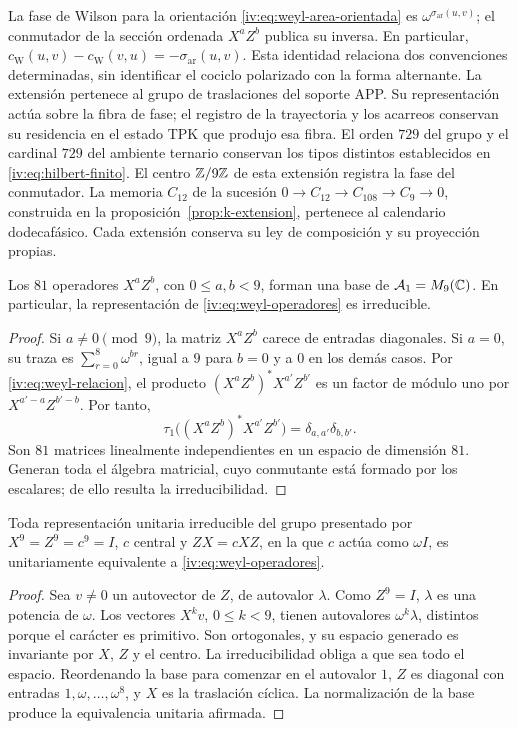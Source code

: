 La fase de Wilson para la orientación
\eqref{iv:eq:weyl-area-orientada} es
\(\omega^{\sigma_{\mathrm{ar}}(u,v)}\); el conmutador de la
sección ordenada \(X^aZ^b\) publica su inversa. En particular,
\(c_{\mathrm W}(u,v)-c_{\mathrm W}(v,u)
=-\sigma_{\mathrm{ar}}(u,v)\).
Esta identidad relaciona dos convenciones determinadas, sin identificar
el cociclo polarizado con la forma alternante. La extensión pertenece
al grupo de traslaciones del soporte APP. Su representación actúa sobre
la fibra de fase; el registro de la trayectoria y los acarreos conservan
su residencia en el estado TPK que produjo esa fibra. El orden \(729\)
del grupo y el cardinal \(729\) del ambiente ternario conservan los
tipos distintos establecidos en \eqref{iv:eq:hilbert-finito}.
El centro \(\mathbb Z/9\mathbb Z\) de esta extensión registra la fase
del conmutador. La memoria \(C_{12}\) de la sucesión
\(0\to C_{12}\to C_{108}\to C_9\to0\), construida en la
proposición~\ref{prop:k-extension}, pertenece al calendario
dodecafásico. Cada extensión conserva su ley de composición y
su proyección propias.

\begin{proposition}
\label{iv:prop:weyl-completo}
Los \(81\) operadores \(X^aZ^b\), con \(0\leq a,b<9\), forman
una base de \(\mathcal A_1=M_9(\mathbb C)\). En particular, la
representación de \eqref{iv:eq:weyl-operadores} es irreducible.
\end{proposition}
\begin{proof}
Si \(a\neq0\pmod9\), la matriz \(X^aZ^b\) carece de entradas
diagonales. Si \(a=0\), su traza es
\(\sum_{r=0}^8\omega^{br}\), igual a \(9\) para \(b=0\) y a
\(0\) en los demás casos. Por \eqref{iv:eq:weyl-relacion}, el
producto \((X^aZ^b)^*X^{a'}Z^{b'}\) es un factor de módulo uno
por \(X^{a'-a}Z^{b'-b}\). Por tanto,
\[
 \tau_1\bigl((X^aZ^b)^*X^{a'}Z^{b'}\bigr)
 =\delta_{a,a'}\delta_{b,b'}.
\]
Son \(81\) matrices linealmente independientes en un espacio de
dimensión \(81\). Generan toda el álgebra matricial, cuyo conmutante
está formado por los escalares; de ello resulta la irreducibilidad.
\end{proof}

\begin{theorem}
\label{iv:thm:weyl-unicidad}
Toda representación unitaria irreducible del grupo presentado por
\(X^9=Z^9=c^9=I\), \(c\) central y \(ZX=cXZ\), en la que
\(c\) actúa como \(\omega I\), es unitariamente equivalente a
\eqref{iv:eq:weyl-operadores}.
\end{theorem}
\begin{proof}
Sea \(v\neq0\) un autovector de \(Z\), de autovalor \(\lambda\).
Como \(Z^9=I\), \(\lambda\) es una potencia de \(\omega\).
Los vectores \(X^kv\), \(0\leq k<9\), tienen autovalores
\(\omega^k\lambda\), distintos porque el carácter es primitivo.
Son ortogonales, y su espacio generado es invariante por \(X\),
\(Z\) y el centro. La irreducibilidad obliga a que sea todo el
espacio. Reordenando la base para comenzar en el autovalor \(1\),
\(Z\) es diagonal con entradas \(1,\omega,\ldots,\omega^8\),
y \(X\) es la traslación cíclica. La normalización de la base
produce la equivalencia unitaria afirmada.
\end{proof}

